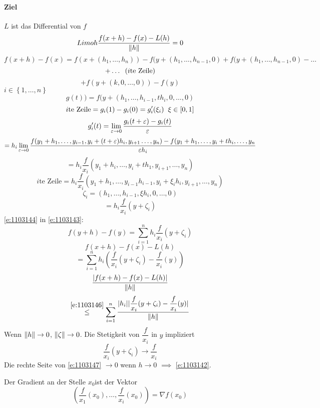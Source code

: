 \begin{Bew}
  \paragraph{Ziel} $L$ ist das Differential von $f$
  \[Limo{h}\frac{f(x+h)-f(x)-L(h)}{\left\| h \right\|}=0\]
  \[f(x+h)-f(x)=f(x+(h_1,\dots,h_n))-f(y+(h_1,\dots,h_{n-1},0)+f(y+(h_1,\dots,h_{n-1}, 0)-\dots\]
  \[+\dots\hspace{2mm}(\text{$i$te Zeile})\]
  \begin{equation}
    \label{e:1103143}
    +f(y+(k,0,\dots,0))-f(y)
  \end{equation}
  $i\in\left\{ 1,\dots,n \right\}$
  \[g(t))=f(y+(h_1,\dots,h_{i-1},th_i,0,\dots,0)\]
  \[\text{$i$te Zeile}=g_i(1)-g_i(0)=g_i'(\xi_i)\hspace{2mm}\xi\in \left[ 0,1 \right]\]
  \[g_i'(t)=\displaystyle\lim_{\varepsilon\rightarrow0}\frac{g_i(t+\varepsilon)-g_i(t)}{\varepsilon}\]
  \[=h_i\displaystyle\lim_{\varepsilon\rightarrow0}\frac{f(y_1+h_1,\dots,y_{i-1},y_i+(t+\varepsilon)h_i,y_{i+1}\dots,y_n)-f(y_1+h_1,\dots,y_i+th_i,\dots,y_n}{\varepsilon h_i}\]
  \[=h_i\dfrac{f}{x_i}\left( y_1+h_i,\dots,y_i+th_1,y_{i+1},\dots,y_n \right)\]
  \[\text{$i$te Zeile}=h_i\dfrac{f}{x_i}(y_1+h_1,\dots,y_{i-1}h_{i-1},y_i+\xi_ih_i,y_{i+1},\dots,y_n)\]
  \[\zeta_i=\left( h_1,\dots,h_{i-1},\xi h_i,0,\dots,0 \right)\]
  \begin{equation}
    \label{e:1103144}
    =h_i\dfrac{f}{x_i}(y+\zeta_i)
  \end{equation}
  \ref{e:1103144} in \ref{e:1103143}:
  \begin{equation}
    \label{e:1103145}
    f(y+h)-f(y)=\sum_{i=1}^nh_i\dfrac{f}{x_i}(y+\zeta_i)
  \end{equation}
  \[f(x+h)-f(x)-L(h)\]
  \begin{equation}
    \label{e:1103146}
    =\sum_{i=1}^nh_i\left( \dfrac{f}{x_i}(y+\zeta_i)-\dfrac{f}{x_i}(y) \right)
  \end{equation}
  \[\frac{\mathopen| f(x+h)-f(x)-L(h) \mathclose|}{\left\| h \right\|}\]
  \begin{equation}
    \label{e:1103147}
    \stackrel{\ref{e:1103146}}{\leq}\sum_{i=1}^n\frac{\mathopen| h_i \mathclose|\mathopen| \dfrac{f}{x_i}(y+\zeta_i)-\dfrac{f}{x_i}(y) \mathclose|}{\left\| h \right\|}
  \end{equation}
  Wenn $\left\| h \right\|\rightarrow 0$, $\left\| \zeta \right\|\rightarrow 0$. Die Stetigkeit von $\dfrac{f}{x_i}$ in $y$ impliziert
  \[\dfrac{f}{x_i}(y+\zeta_i)\to\dfrac{f}{x_i}\]
  Die rechte Seite von \ref{e:1103147} $\to 0$ wenn $h\to 0$ $\implies$ \ref{e:1103142}.
\end{Bew}
\begin{Def}
  Der Gradient an der Stelle $x_0$ist der Vektor
  \[\left( \dfrac{f}{x_1}(x_0),\dots,\dfrac{f}{x_i}(x_0) \right)=\nabla f(x_0)\]
\end{Def}
